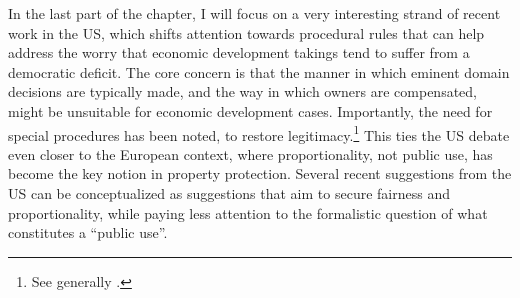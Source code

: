 %


In the last part of the chapter, I will focus on a very interesting strand of recent work in the US, which shifts attention towards procedural rules that can help address the worry that economic development takings tend to suffer from a democratic deficit. The core concern is that the manner in which eminent domain decisions are typically made, and the way in which owners are compensated, might be unsuitable for economic development cases. Importantly, the need for special procedures has been noted, to restore legitimacy.\footnote{See generally \cite{lehavi07,heller08}.} This ties the US debate even closer to the European context, where proportionality, not public use, has become the key notion in property protection. Several recent suggestions from the US can be conceptualized as suggestions that aim to secure fairness and proportionality, while paying less attention to the formalistic question of what constitutes a ``public use''.

